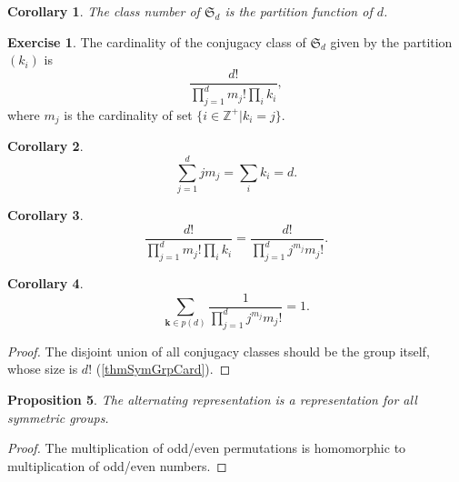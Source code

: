 \documentclass[12pt, letterpaper]{article}
\newcommand{\inte}{\mathbb{Z}}
\newtheorem{prop}{Proposition}[section]
\newtheorem{cor}[prop]{Corollary}
\theoremstyle{definition}
\theoremstyle{remark}
\theoremstyle{definition}
\newtheorem{exe}{Exercise}[section]
\theoremstyle{plain}
\numberwithin{equation}{section}
\begin{document}
	\begin{cor}
		The class number of $\mathfrak{S}_d$ is the partition function of $d$.
	\end{cor}
	\begin{exe}
		The cardinality of the conjugacy class of $\mathfrak{S}_d$
		given by the partition $(k_i)$ is
		\[\frac{d!}{\prod_{j=1}^d m_j! \prod_i k_i},\]
		where $m_j$ is the cardinality of set $\{i\in\inte^+|k_i=j\}$.
	\end{exe}
	\begin{cor}
		\[\sum_{j=1}^{d}jm_j=\sum_{i}k_i=d.\]
	\end{cor}
	\begin{cor}
		\[\frac{d!}{\prod_{j=1}^d m_j! \prod_i k_i}=\frac{d!}{\prod_{j=1}^d j^{m_j}m_j! }.\]
	\end{cor}
	\begin{cor}\label{corEqjmjmj!}
		\[\sum_{\mathbf{k}\in p(d)}\frac{1}{\prod_{j=1}^d j^{m_j}m_j! }=1.\]
	\end{cor}
	\begin{proof}
		The disjoint union of all conjugacy classes should be the group itself,
		whose size is $d!$ (\ref{thmSymGrpCard}).
	\end{proof}

	\begin{prop}
		The alternating representation is a representation for all symmetric groups.
	\end{prop}
	\begin{proof}
		The multiplication of odd/even permutations is homomorphic to multiplication of odd/even numbers.
	\end{proof}
\end{document}
